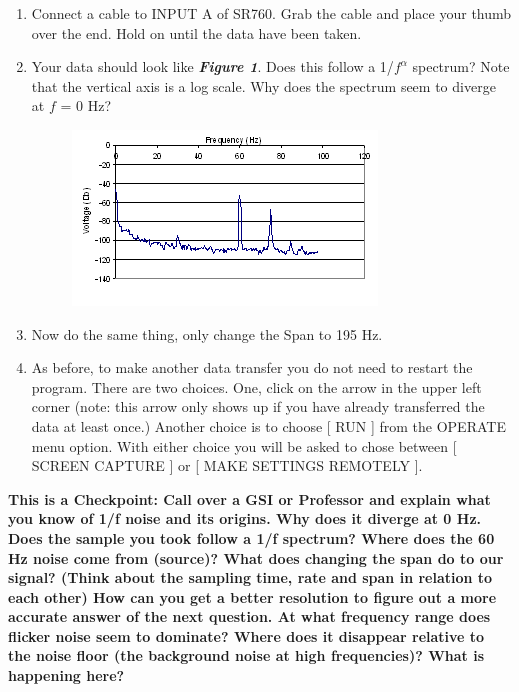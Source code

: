 \documentclass{../lab}
\begin{document}
\begin{enumerate}
\begin{enumerate}
    \end{enumerate}

    \item Connect a cable to INPUT A of SR760. Grab the cable and place your thumb over the end. Hold on until the data have been taken.

    \item Your data should look like \emph{\textbf{Figure 1}}. Does this follow a 1/$f^\alpha$ spectrum? Note that the vertical axis is a log scale. Why does the spectrum seem to diverge at $f$ = 0 Hz?
    \begin{figure}[h]
        \centering
        \href{http://experimentationlab.berkeley.edu/sites/default/files/images/LLSimage019.gif}{\includegraphics[width=0.5\linewidth]{images/LLSimage019.png}}
        \caption{}
        \label{fig:LLSimage019}
    \end{figure}

    \item Now do the same thing, only change the Span to 195 Hz.

    \item As before, to make another data transfer you do not need to restart the program. There are two choices. One, click on the arrow in the upper left corner (note: this arrow only shows up if you have already transferred the data at least once.) Another choice is to choose [ RUN ] from the OPERATE menu option. With either choice you will be asked to chose between [ SCREEN CAPTURE ] or [ MAKE SETTINGS REMOTELY ].

\end{enumerate}


\textbf{This is a Checkpoint: Call over a GSI or Professor and explain what you know of 1/f noise and its origins. Why does it diverge at 0 Hz. Does the sample you took follow a 1/f spectrum? Where does the 60 Hz noise come from (source)? What does changing the span do to our signal? (Think about the sampling time, rate and span in relation to each other) How can you get a better resolution to figure out a more accurate answer of the next question. At what frequency range does flicker noise seem to dominate? Where does it disappear relative to the noise floor (the background noise at high frequencies)? What is happening here? }
\end{document}
